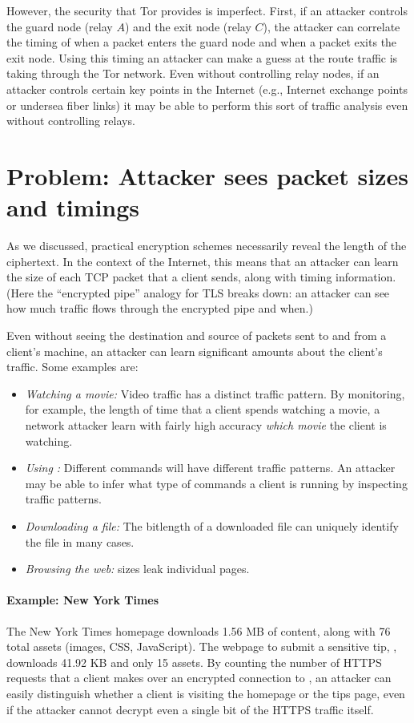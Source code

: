 However, the security that Tor provides is imperfect.
First, if an attacker controls the guard node (relay $A$) and the
exit node (relay $C$), the attacker can correlate the timing of
when a packet enters the guard node and when a packet
exits the exit node.
Using this timing an attacker can make a guess at the route
traffic is taking through the Tor network.
Even without controlling relay nodes, if an attacker 
controls certain key points in the Internet (e.g., Internet exchange points
or undersea fiber links) it may be able to perform this sort
of traffic analysis even without controlling relays.

\section{Problem: Attacker sees packet sizes and timings}
As we discussed, practical encryption
schemes necessarily reveal the length of the
ciphertext. In the context of the Internet,
this means that an attacker can learn the size
of each TCP packet that a client sends, along
with timing information.
(Here the ``encrypted pipe'' analogy for TLS
breaks down: an attacker can see how much traffic
flows through the encrypted pipe and when.)

Even without seeing the destination and source of packets sent to and from 
a client's machine, an attacker can learn significant amounts about 
the client's traffic.
Some examples are:
\begin{itemize}
  \item \emph{Watching a movie:} Video traffic has a distinct traffic pattern.
      By monitoring, for example, the length of time that a client spends 
      watching a movie, a network attacker learn with 
      fairly high accuracy \emph{which movie} the client is watching.
  \item \emph{Using :} 
      Different commands will have different traffic patterns.
      An attacker may be able to infer what type of commands a client 
      is running by inspecting traffic patterns.
  \item \emph{Downloading a file:}
      The bitlength of a downloaded file can uniquely identify the
      file in many cases.
  \item \emph{Browsing the web:} sizes leak individual pages.
\end{itemize}

\paragraph{Example: New York Times} The New York
Times homepage  downloads 1.56
MB of content, along with 76 total assets (images, CSS,
JavaScript). The webpage to submit
a sensitive tip, , downloads
41.92 KB and only 15 assets. By counting the
number of HTTPS requests that a client makes over an
encrypted connection to , an attacker 
can easily distinguish whether a client is
visiting the homepage or the tips page, even if
the attacker cannot decrypt even a single bit of
the HTTPS traffic itself.

